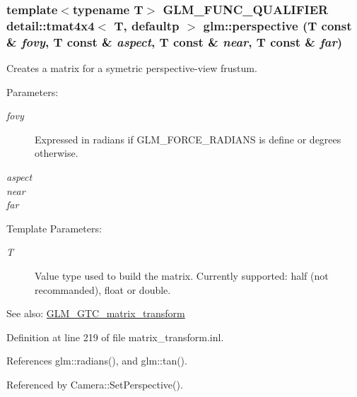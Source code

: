 \hypertarget{group__gtc__matrix__transform_g6f705d60660ad2d4ef540ca0bb59273e}{
\subsubsection[perspective]{\setlength{\rightskip}{0pt plus 5cm}template$<$typename T$>$ GLM\_\-FUNC\_\-QUALIFIER detail::tmat4x4$<$ T, defaultp $>$ glm::perspective (T const \& {\em fovy}, \/  T const \& {\em aspect}, \/  T const \& {\em near}, \/  T const \& {\em far})}}
\label{group__gtc__matrix__transform_g6f705d60660ad2d4ef540ca0bb59273e}


Creates a matrix for a symetric perspective-view frustum.

\begin{Desc}
\item[Parameters:]
\begin{description}
\item[{\em fovy}]Expressed in radians if GLM\_\-FORCE\_\-RADIANS is define or degrees otherwise. \item[{\em aspect}]\item[{\em near}]\item[{\em far}]\end{description}
\end{Desc}
\begin{Desc}
\item[Template Parameters:]
\begin{description}
\item[{\em T}]Value type used to build the matrix. Currently supported: half (not recommanded), float or double. \end{description}
\end{Desc}
\begin{Desc}
\item[See also:]\hyperlink{group__gtc__matrix__transform}{GLM\_\-GTC\_\-matrix\_\-transform} \end{Desc}


Definition at line 219 of file matrix\_\-transform.inl.

References glm::radians(), and glm::tan().

Referenced by Camera::SetPerspective().

